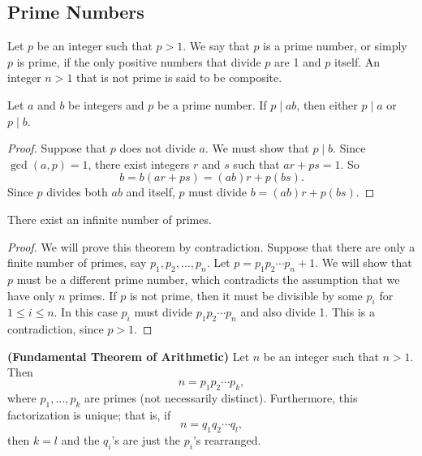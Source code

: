  
\subsection*{Prime Numbers}

Let $p$ be an integer such that $p > 1$.  We say that $p$ is a {\bfi prime number}, or simply $p$ is {\bfi prime}, if the only positive numbers that divide $p$ are 1 and $p$ itself.  An integer $n > 1$ that is not prime is said to be {\bfi composite}.  

\begin{lemma}[Euclid]\label{integers_theorem_prime_divide}
Let $a$ and $b$ be integers and $p$ be a prime number.  If $p \mid ab$, then either $p \mid a$ or $p \mid b$. 
\end{lemma}

\begin{proof}
Suppose that $p$ does not divide $a$.  We must show that $p \mid b$. Since $\gcd( a, p ) = 1$, there exist integers $r$ and $s$ such that $ar + ps = 1$.  So 
\[
b = b(ar + ps) = (ab)r + p(bs).
\]
Since $p$ divides both $ab$ and itself, $p$ must divide $b = (ab)r + p(bs)$. 
\end{proof}

\begin{theorem}[Euclid]\label{integers_inifinite_primes}
There exist an infinite number of primes.
\end{theorem}

\begin{proof}
We will prove this theorem by contradiction.  Suppose that there are only a finite number of primes, say $p_1, p_2, \ldots, p_n$.  Let $p = p_1  p_2  \cdots  p_n + 1$.  We will show that $p$ must be a different prime number, which contradicts the assumption that we have only $n$ primes.  If $p$ is not prime, then it must be divisible by some $p_i$ for $1 \leq i \leq n$. In this  case $p_i$ must divide $p_1 p_2 \cdots p_n$ and also divide 1.  This is a contradiction, since $p > 1$. 
\end{proof}

\begin{theorem} {\bf (Fundamental Theorem of Arithmetic)} \label{integers_theorem_FTA}
Let $n$ be an integer such that $n > 1$.  Then
\[
n = p_1 p_2 \cdots p_k,
\]
where $p_1, \ldots, p_k$ are  primes (not necessarily distinct).  Furthermore, this factorization is unique; that is, if 
\[
n = q_1 q_2 \cdots q_l,
\]
then $k = l$ and the $q_i$'s are just the $p_i$'s rearranged.
\end{theorem}

